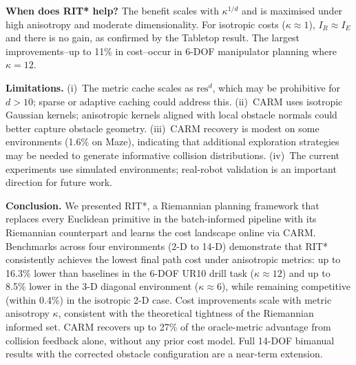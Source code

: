 \documentclass[journal]{IEEEtran}
\newcommand{\IR}{I_{\!R}}
\newcommand{\IE}{I_{\!E}}
\begin{document}
\textbf{When does RIT* help?}
The benefit scales with $\kappa^{1/d}$ and is maximised under high
anisotropy and moderate dimensionality.
For isotropic costs ($\kappa \approx 1$), $\IR \approx \IE$ and
there is no gain, as confirmed by the Tabletop result.
The largest improvements--up to 11\% in cost--occur in 6-DOF
manipulator planning where $\kappa = 12$.

\textbf{Limitations.}
(i)~The metric cache scales as $\mathrm{res}^d$, which may be
prohibitive for $d > 10$; sparse or adaptive caching could address
this.
(ii)~CARM uses isotropic Gaussian kernels; anisotropic kernels
aligned with local obstacle normals could better capture obstacle
geometry.
(iii)~CARM recovery is modest on some environments (1.6\% on Maze),
indicating that additional exploration strategies may be needed to
generate informative collision distributions.
(iv)~The current experiments use simulated environments; real-robot
validation is an important direction for future work.

\textbf{Conclusion.}
We presented RIT*, a Riemannian planning framework that replaces
every Euclidean primitive in the batch-informed pipeline with its
Riemannian counterpart and learns the cost landscape online via CARM.
Benchmarks across four environments (2-D to 14-D) demonstrate that
RIT* consistently achieves the lowest final path cost under anisotropic
metrics: up to 16.3\% lower than baselines in the 6-DOF UR10 drill
task ($\kappa\approx12$) and up to 8.5\% lower in the 3-D diagonal
environment ($\kappa\approx6$), while remaining competitive (within
0.4\%) in the isotropic 2-D case.
Cost improvements scale with metric anisotropy $\kappa$, consistent
with the theoretical tightness of the Riemannian informed set.
CARM recovers up to 27\% of the oracle-metric advantage from
collision feedback alone, without any prior cost model.
Full 14-DOF bimanual results with the corrected obstacle configuration
are a near-term extension.


\balance


\end{document}
